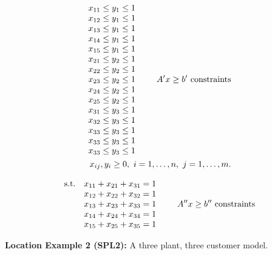 \documentclass[11pt]{article}
\begin{document}
\begin{eqnarray*}
\begin{array}{lll}
x_{11}\leq y_{1}\leq 1 & &  \\
x_{12}\leq y_{1}\leq 1 & & \\
x_{13}\leq y_{1}\leq 1 & & \\
x_{14}\leq y_{1}\leq 1 & & \\
x_{15}\leq y_{1}\leq 1 & & \\
x_{21}\leq y_{2}\leq 1 & & \\
x_{22}\leq y_{2}\leq 1 & &   \\
x_{23}\leq y_{2}\leq 1 & & \\
x_{24}\leq y_{2}\leq 1 & & \\
x_{25}\leq y_{2}\leq 1 & & \\
x_{31}\leq y_{3}\leq 1 & & \\
x_{32}\leq y_{3}\leq 1 & &\\
x_{33}\leq y_{3}\leq 1 & &\\ 
x_{33}\leq y_{3}\leq 1 & &\\ 
x_{33}\leq y_{3}\leq 1 & &\\ 
\end{array}
 A^{\prime }x \ge b^{\prime} \,\, {\rm constraints} \\
x_{ij},y_{i}\ge 0 , \,\, i = 1, \ldots, n, \, \, j = 1, \ldots, m.   
\end{eqnarray*}

 
\[
\begin{array}{llll}
{\rm s.t.} &x_{11}+x_{21}+x_{31}  = 1 & & \\
&x_{12}+x_{22}+x_{32} = 1 & &   \\
&x_{13}+x_{23}+x_{33} = 1 & &  \\
&x_{14}+x_{24}+x_{34} = 1 & &  \\
&x_{15}+x_{25}+x_{35} = 1 & &  
\end{array}   A^{\prime \prime}   x \ge b^{\prime \prime} \,\, {\rm
constraints}
\]
  
  


                      


\vskip 12pt

{\bf Location Example 2 (SPL2):} A three plant, three customer model.

\vskip 8pt
\end{document}
